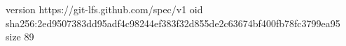 version https://git-lfs.github.com/spec/v1
oid sha256:2ed9507383dd95adf4c98244ef383f32d855de2c63674bf400fb78fc3799ea95
size 89
